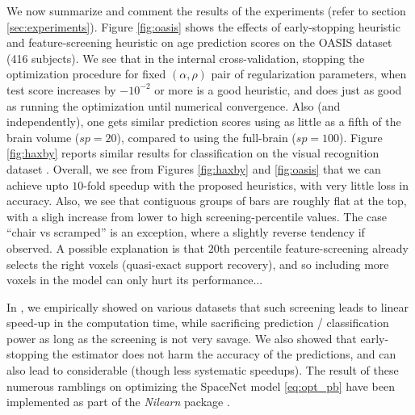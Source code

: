We now summarize and comment the results of the experiments (refer to
section \ref{sec:experiments}).
Figure \ref{fig:oasis} shows the effects of early-stopping heuristic
and feature-screening heuristic on age prediction scores on the OASIS
dataset \citep{marcus2007open} (416 subjects). We see that in the
internal cross-validation, stopping  the optimization procedure for
fixed $(\alpha, \rho)$ pair of regularization parameters, when test
score increases by $-10^{-2}$ or more is a good heuristic, and does just
as good as running the optimization until numerical convergence. 
Also (and independently), one gets similar prediction scores using as
little as a fifth of the brain volume ($sp=20$),
compared to using the full-brain ($sp=100$).
Figure \ref{fig:haxby} reports similar results for classification on
the visual recognition dataset \citep{haxby2001}. Overall, we see from
Figures \ref{fig:haxby} and \ref{fig:oasis} that we can achieve upto
$10$-fold speedup with the proposed heuristics, with very little loss
in accuracy. Also, we see that contiguous groups of bars are roughly flat at the top, with a
    sligh increase from lower to high screening-percentile values. The
    case ``chair vs scramped'' is an exception, where a slightly reverse tendency
    if observed. A possible explanation is that $20$th percentile
    feature-screening already selects the right voxels (quasi-exact
    support recovery), and so including more voxels in the model can only hurt its
    performance...    

 In  \citep{dohmatob2015speeding}, we empirically showed on various
datasets that such screening leads to linear speed-up in the computation
time, while sacrificing prediction / classification power as long as the
screening is not very savage. We also showed that early-stopping the
estimator does not harm the accuracy of the predictions, and can also lead
to considerable (though less systematic speedups).
The result of these numerous ramblings on optimizing the SpaceNet model \eqref{eq:opt_pb} have been implemented as part of the \textit{Nilearn} package  \citep{nilearn}.




